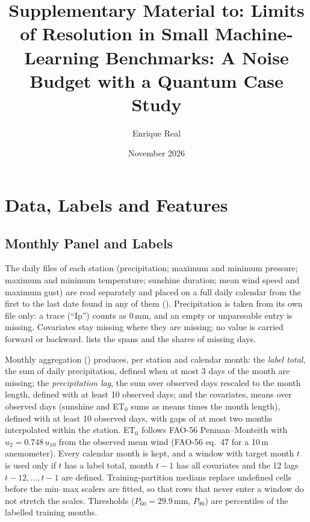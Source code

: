 \documentclass[11pt,a4paper]{article}
\title{\textbf{Supplementary Material to: Limits of Resolution in Small Machine-Learning Benchmarks: A Noise Budget with a Quantum Case Study}}
\author[1,*]{Enrique Real}
\affil[1]{Independent Researcher, Alicante, Spain. ORCID: \href{https://orcid.org/0009-0006-3862-9797}{0009-0006-3862-9797}}
\affil[*]{\textit{Corresponding author: enriquerb32@gmail.com}}
\date{November 2026}
\begin{document}
\maketitle
\renewcommand{\thesection}{S\arabic{section}}
\setcounter{section}{0}
\renewcommand{\thetable}{S\arabic{table}}
\renewcommand{\thefigure}{S\arabic{figure}}
\renewcommand{\theequation}{S\arabic{equation}}

\section{Data, Labels and Features}
\label{app:pipeline}

\subsection{Monthly Panel and Labels}

The daily files of each station (precipitation; maximum and minimum pressure; maximum and minimum temperature; sunshine duration; mean wind speed and maximum gust) are read separately and placed on a full daily calendar from the first to the last date found in any of them (). Precipitation is taken from its own file only: a trace (``Ip'') counts as 0\,mm, and an empty or unparseable entry is missing. Covariates stay missing where they are missing; no value is carried forward or backward.  lists the spans and the shares of missing days.

Monthly aggregation () produces, per station and calendar month: the \emph{label total}, the sum of daily precipitation, defined when at most 3 days of the month are missing; the \emph{precipitation lag}, the sum over observed days rescaled to the month length, defined with at least 10 observed days; and the covariates, means over observed days (sunshine and ET$_0$ sums as means times the month length), defined with at least 10 observed days, with gaps of at most two months interpolated within the station. ET$_0$ follows FAO-56 Penman--Monteith with $u_2=0.748\,u_{10}$ from the observed mean wind (FAO-56 eq.~47 for a 10\,m anemometer). Every calendar month is kept, and a window with target month $t$ is used only if $t$ has a label total, month $t-1$ has all covariates and the 12 lags $t-12,\dots,t-1$ are defined. Training-partition medians replace undefined cells before the min--max scalers are fitted, so that rows that never enter a window do not stretch the scales. Thresholds ($P_{60}=29.9$\,mm, $P_{90}$) are percentiles of the labelled training months.
\end{document}
